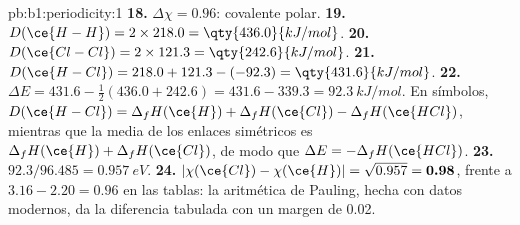 \begin{solution}{pb:b1:periodicity:1}
\textbf{18.} $\Delta\chi = 0.96$: covalente polar.
\textbf{19.} $D(\ce{H-H}) = 2 \times 218.0 = \qty{436.0}{kJ/mol}$.
\textbf{20.} $D(\ce{Cl-Cl}) = 2 \times 121.3 = \qty{242.6}{kJ/mol}$.
\textbf{21.} $D(\ce{H-Cl}) = 218.0 + 121.3 - (-92.3) = \qty{431.6}{kJ/mol}$.
\textbf{22.} $\Delta E = 431.6 - \tfrac12(436.0 + 242.6) = 431.6 - 339.3 =
\qty{92.3}{kJ/mol}$. En símbolos, $D(\ce{H-Cl}) = \Delta_fH(\ce{H}) +
\Delta_fH(\ce{Cl}) - \Delta_fH(\ce{HCl})$, mientras que la media de los
enlaces simétricos es $\Delta_fH(\ce{H}) + \Delta_fH(\ce{Cl})$, de modo que $\Delta E =
-\Delta_fH(\ce{HCl})$.
\textbf{23.} $92.3/96.485 = \qty{0.957}{eV}$.
\textbf{24.} $|\chi(\ce{Cl}) - \chi(\ce{H})| = \sqrt{0.957} =
\textbf{0.98}$, frente a $3.16 - 2.20 = 0.96$ en las tablas: la
aritmética de Pauling, hecha con datos modernos, da la diferencia
tabulada con un margen de 0.02.
\end{solution}
